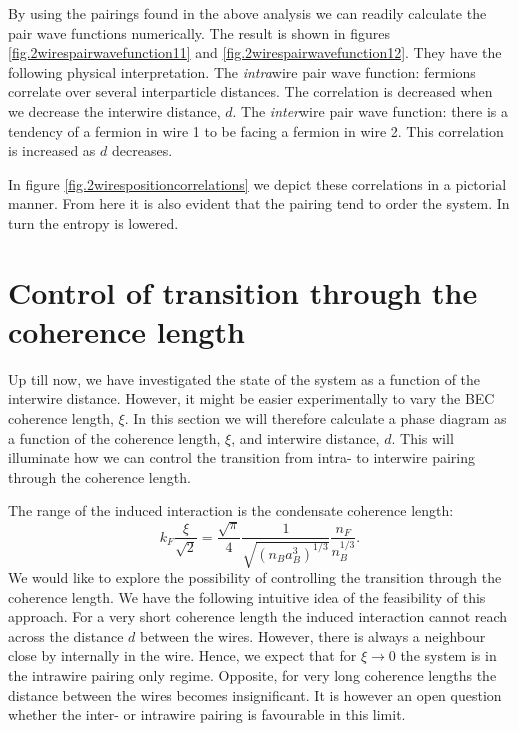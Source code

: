 By using the pairings found in the above analysis we can readily calculate the pair wave functions numerically. The result is shown in figures \ref{fig.2wirespairwavefunction11} and \ref{fig.2wirespairwavefunction12}. They have the following physical interpretation. The \textit{intra}wire pair wave function: fermions correlate over several interparticle distances. The correlation is decreased when we decrease the interwire distance, $d$. The \textit{inter}wire pair wave function: there is a tendency of a fermion in wire 1 to be facing a fermion in wire 2. This correlation is increased as $d$ decreases. 

In figure \ref{fig.2wirespositioncorrelations} we depict these correlations in a pictorial manner. From here it is also evident that the pairing tend to order the system. In turn the entropy is lowered. 


\section{Control of transition through the coherence length}
\label{sec.2wires_crossover_control_coherence_length}
Up till now, we have investigated the state of the system as a function of the interwire distance. However, it might be easier experimentally to vary the BEC coherence length, $\xi$. In this section we will therefore calculate a phase diagram as a function of the coherence length, $\xi$, and interwire distance, $d$. This will illuminate how we can control the transition from intra- to interwire pairing through the coherence length. 

The range of the induced interaction is the condensate coherence length:
\begin{equation}
k_F\frac{\xi}{\sqrt{2}} = \frac{\sqrt{\pi}}{4}\frac{1}{\sqrt{(n_Ba_B^3)^{1/3}}}\frac{n_F}{n_B^{1/3}}.
\label{eq.RangefunctionofrBBnB}
\end{equation}
We would like to explore the possibility of controlling the transition through the coherence length. We have the following intuitive idea of the feasibility of this approach. For a very short coherence length the induced interaction cannot reach across the distance $d$ between the wires. However, there is always a neighbour close by internally in the wire. Hence, we expect that for $\xi \to 0$ the system is in the intrawire pairing only regime. Opposite, for very long coherence lengths the distance between the wires becomes insignificant. It is however an open question whether the inter- or intrawire pairing is favourable in this limit. 


